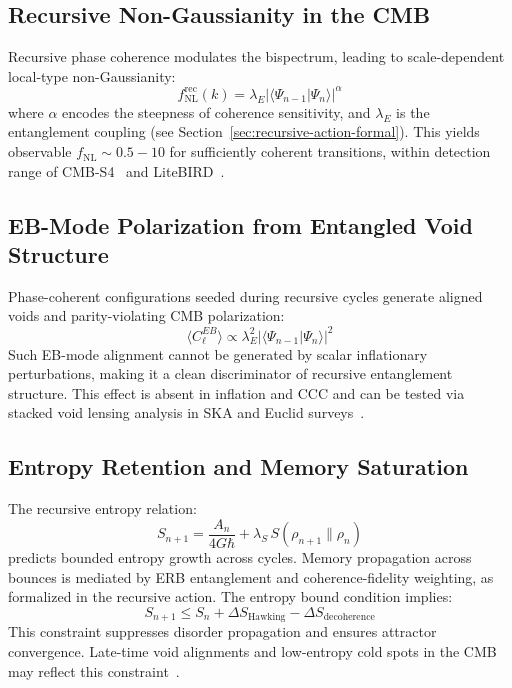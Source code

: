 \subsection{Recursive Non-Gaussianity in the CMB}

Recursive phase coherence modulates the bispectrum, leading to scale-dependent local-type non-Gaussianity:
\[
f_{\text{NL}}^{\text{rec}}(k) = \lambda_E \left|\langle \Psi_{n-1} | \Psi_n \rangle\right|^\alpha
\]
where \( \alpha \) encodes the steepness of coherence sensitivity, and \( \lambda_E \) is the entanglement coupling (see Section~\ref{sec:recursive-action-formal}). This yields observable \( f_{\text{NL}} \sim 0.5 - 10 \) for sufficiently coherent transitions, within detection range of CMB-S4~\cite{cmbs4forecast2019} and LiteBIRD~\cite{litebird2023}.

\subsection{EB-Mode Polarization from Entangled Void Structure}

Phase-coherent configurations seeded during recursive cycles generate aligned voids and parity-violating CMB polarization:
\[
\langle C_\ell^{EB} \rangle \propto \lambda_E^2 \left|\langle \Psi_{n-1} | \Psi_n \rangle\right|^2
\]
Such EB-mode alignment cannot be generated by scalar inflationary perturbations, making it a clean discriminator of recursive entanglement structure. This effect is absent in inflation and CCC and can be tested via stacked void lensing analysis in SKA and Euclid surveys~\cite{dewdney2009ska, laureijs2011euclid}.

\subsection{Entropy Retention and Memory Saturation}

The recursive entropy relation:
\[
S_{n+1} = \frac{A_{n}}{4G\hbar} + \lambda_S \, S(\rho_{n+1} \| \rho_n)
\]
predicts bounded entropy growth across cycles. Memory propagation across bounces is mediated by ERB entanglement and coherence-fidelity weighting, as formalized in the recursive action. The entropy bound condition implies:
\[
S_{n+1} \leq S_n + \Delta S_{\text{Hawking}} - \Delta S_{\text{decoherence}}
\]
This constraint suppresses disorder propagation and ensures attractor convergence. Late-time void alignments and low-entropy cold spots in the CMB may reflect this constraint~\cite{almheiri2019entropy}.

